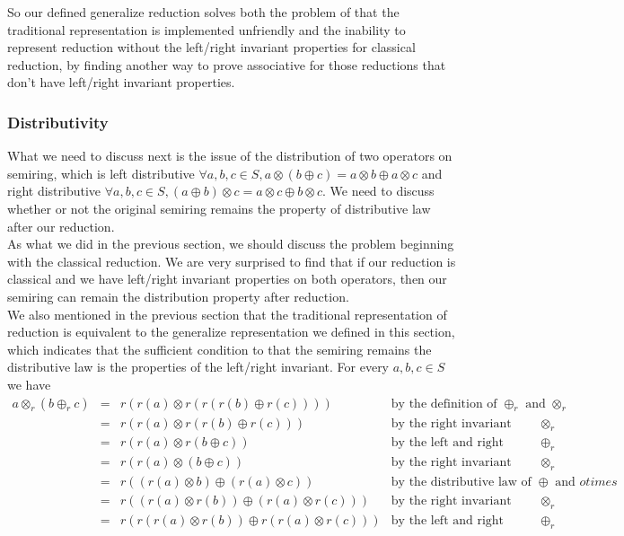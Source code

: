 \documentclass[a4paper,10pt]{article}
\begin{document}
So our defined generalize reduction solves both the problem of that the traditional representation is implemented unfriendly and the inability to represent reduction without the left/right invariant properties for classical reduction, by finding another way to prove associative for those reductions that don't have left/right invariant properties.\\
\subsubsection{Distributivity}
What we need to discuss next is the issue of the distribution of two operators on semiring, which is left distributive $\forall a,b,c \in S, a\otimes (b \oplus c) = a \otimes b \oplus a \otimes c$ and right distributive $\forall a,b,c \in S, (a \oplus b) \otimes c = a \otimes c \oplus b \otimes c$.
We need to discuss whether or not the original semiring remains the property of distributive law after our reduction. \\
As what we did in the previous section, we should discuss the problem beginning  with  the classical reduction. We are very surprised to find that if our reduction is classical and we have left/right invariant properties on both operators, then our semiring can remain the distribution property after reduction.\\
We also mentioned in the previous section that the traditional representation of reduction is equivalent to the generalize representation we defined in this section, which indicates that the sufficient condition to that the semiring remains the distributive law is the properties of the left/right invariant.
For every $a,b,c \in S$ we have   
\[
\begin{array}{rcll} 
a \otimes_r (b \oplus_r c)  & = & r(r(a) \otimes r(r(r(b)\oplus r(c)))) & \mbox{by the definition of $\oplus_r$ and $\otimes_r$}\\
& = & r(r(a) \otimes r(r(b)\oplus r(c))) & \mbox{by the right invariant property of $\otimes_r$}\\
& = & r(r(a) \otimes r(b \oplus c)) & \mbox{by the left and right invariant property of $\oplus_r$}\\
& = & r(r(a) \otimes (b \oplus c)) & \mbox{by the right invariant property of $\otimes_r$}\\
& = & r((r(a) \otimes b) \oplus (r(a) \otimes c)) & \mbox{by the distributive law of $\oplus$ and $otimes$}\\
& = & r((r(a) \otimes r(b)) \oplus (r(a) \otimes r(c))) & \mbox{by the right invariant property of $\otimes_r$}\\
& = & r(r(r(a) \otimes r(b)) \oplus r(r(a) \otimes r(c))) & \mbox{by the left and right invariant property of $\oplus_r$}\\
\end{array}
\] 
\end{document}
